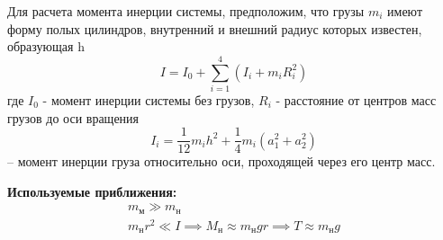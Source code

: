 \documentclass[a4paper,12pt]{article} %
\begin{document}
Для расчета момента инерции системы, предположим, что грузы $m_i$ имеют форму полых цилиндров, внутренний и внешний радиус которых известен, образующая h
\begin{equation}
I = I_0 + \sum_{i=1}^4(I_i+m_iR_i^2)
\label{I}
\end{equation}
где $I_0$ - момент инерции системы без грузов, $R_i$ -  расстояние от центров масс грузов до оси вращения
\begin{equation}
I_i = \frac{1}{12}m_ih^2+\frac{1}{4}m_i(a_1^2+a_2^2)
\label{Ii}
\end{equation} -- момент инерции груза относительно оси, проходящей через его центр масс.

\textbf{Используемые приближения:} 
\begin{gather}
	m_\text{м} \gg m_\text{н} \\ 
	m_\text{н} r^2 \ll I \implies M_\text{н} \approx m_\text{н}gr \implies T \approx m_\text{н}g
\end{gather} 
\end{document}
